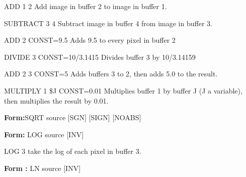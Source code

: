 {\newpage\clearpage
{}%
\begin{example}
  \item[ADD 1 2\hfill]{Add image in buffer 2 to image in buffer 1.}
  \item[SUBTRACT 3 4\hfill]{Subtract image in buffer 4 from image in buffer 3.}
\end{example}%
\lthtmlfigureZ
\lthtmlcheckvsize\clearpage}

{\newpage\clearpage
{}%
\begin{example}
  \item[ADD 2 CONST=9.5\hfill]{Adds 9.5 to every pixel in buffer 2}
  \item[DIVIDE 3 CONST=10/3.1415\hfill]{  Divides buffer 3 by 10/3.14159}
\end{example}%
\lthtmlfigureZ
\lthtmlcheckvsize\clearpage}

{\newpage\clearpage
{}%
\begin{example}
  \item[ADD 2 3 CONST=5\hfill]{Adds buffers 3 to 2, then adds 5.0
       to the result.}
  \item[MULTIPLY 1 \$J CONST=0.01\hfill]{ Multiplies buffer 1 by buffer J
       (J a variable), then multiplies the result by 0.01.}
\end{example}%
\lthtmlfigureZ
\lthtmlcheckvsize\clearpage}

{\newpage\clearpage
{}%
\begin{command}
  \item[\textbf{Form:}SQRT source {[SGN]} {[SIGN]} {[NOABS]}\hfill]{}
\end{command}%
\lthtmlfigureZ
\lthtmlcheckvsize\clearpage}

{\newpage\clearpage
{}%
\begin{command}
  \item[\textbf{Form:} LOG source {[INV]}\hfill]{}
\end{command}%
\lthtmlfigureZ
\lthtmlcheckvsize\clearpage}

{\newpage\clearpage
{}%
\begin{example}
  \item[LOG 3\hfill]{take the log of each pixel in buffer 3.}
\end{example}%
\lthtmlfigureZ
\lthtmlcheckvsize\clearpage}

{\newpage\clearpage
{}%
\begin{command}
  \item[\textbf{Form :} LN source {[INV]}\hfill]{}
\end{command}%
\lthtmlfigureZ
\lthtmlcheckvsize\clearpage}

